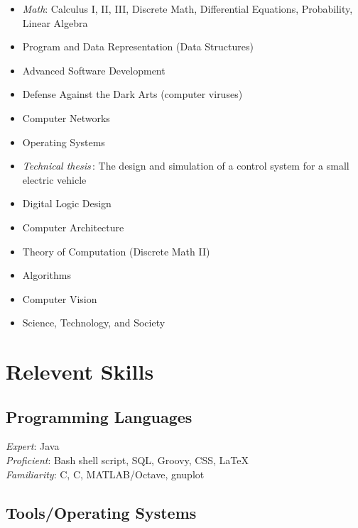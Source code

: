 \documentclass[a4paper]{article}
\newcommand{\CC}{C\nolinebreak\hspace{-.05em}\raisebox{.4ex}{\tiny\bf
    +}\nolinebreak\hspace{-.10em}\raisebox{.4ex}{\tiny\bf +}}
\def\CC{{C\nolinebreak[4]\hspace{-.05em}\raisebox{.4ex}{\tiny\bf ++}}}
\begin{document}
  \begin{minipage}[t]{0.49\textwidth} \raggedright
    \raggedright
    \begin{itemize}
    \item \textit{Math}: Calculus I, II, III, Discrete Math, Differential
      Equations, Probability, Linear Algebra
    \item Program and Data Representation (Data Structures)
    \item Advanced Software Development
    \item Defense Against the Dark Arts (computer viruses)
    \item Computer Networks
    \item Operating Systems
    \end{itemize}
  \end{minipage}
  \begin{minipage}[t]{0.49\textwidth} \raggedright
    \begin{itemize}
    \item \textsl{Technical thesis\,}: The design and simulation of a control
      system for a small electric vehicle
    \item Digital Logic Design
    \item Computer Architecture
    \item Theory of Computation (Discrete Math II)
    \item Algorithms
    \item Computer Vision
    \item Science, Technology, and Society
    \end{itemize}
  \end{minipage}

\section*{Relevent Skills}

  \subsection*{Programming Languages}

  \textsl{Expert}: Java \\
  \textsl{Proficient}: Bash shell script, SQL, Groovy, CSS, \LaTeX \\
  \textsl{Familiarity}: C, \CC, MATLAB/Octave, gnuplot

  \subsection*{Tools/Operating Systems}
\end{document}

